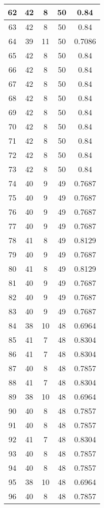 \documentclass[letterpaper, 12pt]{article}
\begin{document}
\begin{longtable}{|c|c|c|c|c|}
\hline
62 & 42 & 8 & 50 & 0.84 \\
\hline
63 & 42 & 8 & 50 & 0.84 \\
\hline
64 & 39 & 11 & 50 & 0.7086 \\
\hline
65 & 42 & 8 & 50 & 0.84 \\
\hline
66 & 42 & 8 & 50 & 0.84 \\
\hline
67 & 42 & 8 & 50 & 0.84 \\
\hline
68 & 42 & 8 & 50 & 0.84 \\
\hline
69 & 42 & 8 & 50 & 0.84 \\
\hline
70 & 42 & 8 & 50 & 0.84 \\
\hline
71 & 42 & 8 & 50 & 0.84 \\
\hline
72 & 42 & 8 & 50 & 0.84 \\
\hline
73 & 42 & 8 & 50 & 0.84 \\
\hline
74 & 40 & 9 & 49 & 0.7687 \\
\hline
75 & 40 & 9 & 49 & 0.7687 \\
\hline
76 & 40 & 9 & 49 & 0.7687 \\
\hline
77 & 40 & 9 & 49 & 0.7687 \\
\hline
78 & 41 & 8 & 49 & 0.8129 \\
\hline
79 & 40 & 9 & 49 & 0.7687 \\
\hline
80 & 41 & 8 & 49 & 0.8129 \\
\hline
81 & 40 & 9 & 49 & 0.7687 \\
\hline
82 & 40 & 9 & 49 & 0.7687 \\
\hline
83 & 40 & 9 & 49 & 0.7687 \\
\hline
84 & 38 & 10 & 48 & 0.6964 \\
\hline
85 & 41 & 7 & 48 & 0.8304 \\
\hline
86 & 41 & 7 & 48 & 0.8304 \\
\hline
87 & 40 & 8 & 48 & 0.7857 \\
\hline
88 & 41 & 7 & 48 & 0.8304 \\
\hline
89 & 38 & 10 & 48 & 0.6964 \\
\hline
90 & 40 & 8 & 48 & 0.7857 \\
\hline
91 & 40 & 8 & 48 & 0.7857 \\
\hline
92 & 41 & 7 & 48 & 0.8304 \\
\hline
93 & 40 & 8 & 48 & 0.7857 \\
\hline
94 & 40 & 8 & 48 & 0.7857 \\
\hline
95 & 38 & 10 & 48 & 0.6964 \\
\hline
96 & 40 & 8 & 48 & 0.7857 \\

\end{longtable}
\end{document}
